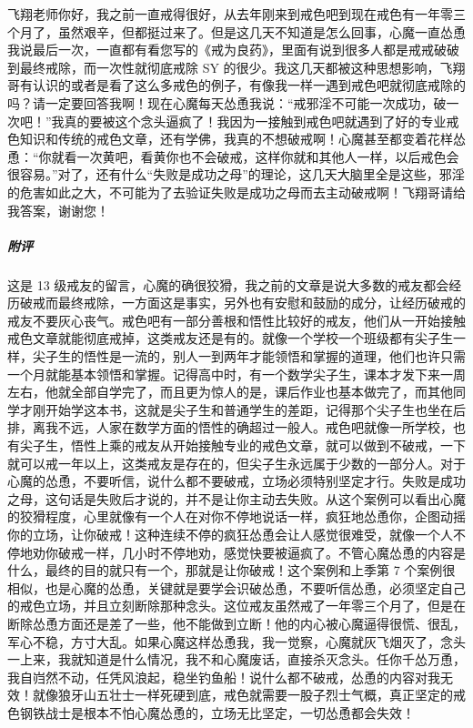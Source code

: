 \begin{case}
    飞翔老师你好，我之前一直戒得很好，从去年刚来到戒色吧到现在戒色有一年零三个月了，虽然艰辛，但都挺过来了。但是这几天不知道是怎么回事，心魔一直怂恿我说最后一次，一直都有看您写的《戒为良药》，里面有说到很多人都是戒戒破破到最终戒除，而一次性就彻底戒除 SY 的很少。我这几天都被这种思想影响，飞翔哥有认识的或者是看了这么多戒色的例子，有像我一样一遇到戒色吧就彻底戒除的吗？请一定要回答我啊！现在心魔每天怂恿我说：“戒邪淫不可能一次成功，破一次吧！”我真的要被这个念头逼疯了！我因为一接触到戒色吧就遇到了好的专业戒色知识和传统的戒色文章，还有学佛，我真的不想破戒啊！心魔甚至都变着花样怂恿：“你就看一次黄吧，看黄你也不会破戒，这样你就和其他人一样，以后戒色会很容易。”对了，还有什么“失败是成功之母”的理论，这几天大脑里全是这些，邪淫的危害如此之大，不可能为了去验证失败是成功之母而去主动破戒啊！飞翔哥请给我答案，谢谢您！
    \subparagraph{附评} 这是 13 级戒友的留言，心魔的确很狡猾，我之前的文章是说大多数的戒友都会经历破戒而最终戒除，一方面这是事实，另外也有安慰和鼓励的成分，让经历破戒的戒友不要灰心丧气。戒色吧有一部分善根和悟性比较好的戒友，他们从一开始接触戒色文章就能彻底戒掉，这类戒友还是有的。就像一个学校一个班级都有尖子生一样，尖子生的悟性是一流的，别人一到两年才能领悟和掌握的道理，他们也许只需一个月就能基本领悟和掌握。记得高中时，有一个数学尖子生，课本才发下来一周左右，他就全部自学完了，而且更为惊人的是，课后作业也基本做完了，而其他同学才刚开始学这本书，这就是尖子生和普通学生的差距，记得那个尖子生也坐在后排，离我不远，人家在数学方面的悟性的确超过一般人。戒色吧就像一所学校，也有尖子生，悟性上乘的戒友从开始接触专业的戒色文章，就可以做到不破戒，一下就可以戒一年以上，这类戒友是存在的，但尖子生永远属于少数的一部分人。对于心魔的怂恿，不要听信，说什么都不要破戒，立场必须特别坚定才行。失败是成功之母，这句话是失败后才说的，并不是让你主动去失败。从这个案例可以看出心魔的狡猾程度，心里就像有一个人在对你不停地说话一样，疯狂地怂恿你，企图动摇你的立场，让你破戒！这种连续不停的疯狂怂恿会让人感觉很难受，就像一个人不停地劝你破戒一样，几小时不停地劝，感觉快要被逼疯了。不管心魔怂恿的内容是什么，最终的目的就只有一个，那就是让你破戒！这个案例和上季第 7 个案例很相似，也是心魔的怂恿，关键就是要学会识破怂恿，不要听信怂恿，必须坚定自己的戒色立场，并且立刻断除那种念头。这位戒友虽然戒了一年零三个月了，但是在断除怂恿方面还是差了一些，他不能做到立断！他的内心被心魔逼得很慌、很乱，军心不稳，方寸大乱。如果心魔这样怂恿我，我一觉察，心魔就灰飞烟灭了，念头一上来，我就知道是什么情况，我不和心魔废话，直接杀灭念头。任你千怂万恿，我自岿然不动，任凭风浪起，稳坐钓鱼船！说什么都不破戒，怂恿的内容对我无效！就像狼牙山五壮士一样死硬到底，戒色就需要一股子烈士气概，真正坚定的戒色钢铁战士是根本不怕心魔怂恿的，立场无比坚定，一切怂恿都会失效！
\end{case}

